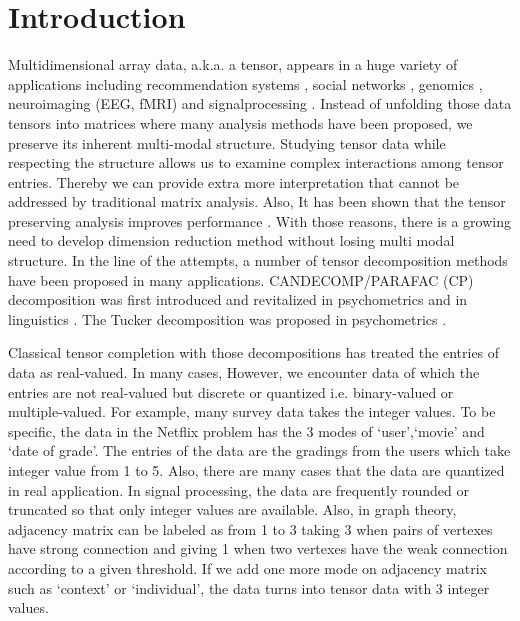 \documentclass{article}
\theoremstyle{plain}
\theoremstyle{definition}
\begin{document}
\section{Introduction}
Multidimensional array data, a.k.a. a tensor, appears in a huge variety of applications including recommendation systems \citep{Kutty2012APR,Adomavicius2008ContextawareRS,Sun2015ProvableST},
social networks \citep{Sun2009MultiVisCS,Nickel2011ATM},
genomics \citep{Wang2017ThreewayCO},
neuroimaging (EEG, fMRI) \citep{Miwakeichi_decomposingeeg}
and signalprocessing \citep{Sidiropoulos2000ParallelFA,Cichocki2015TensorDF}.
Instead of unfolding those data tensors into matrices where many analysis methods have been proposed, we preserve its inherent multi-modal structure. Studying tensor data while respecting the structure allows us to examine complex interactions among tensor entries. Thereby we can provide extra more interpretation that cannot be addressed by traditional matrix analysis. Also, It has been shown that the tensor preserving analysis improves performance \citep{Zare2018ExtensionOP,Wang2018LearningFB}.
With those reasons, there is a growing need to develop dimension reduction method without losing multi modal structure. In the line of the attempts, a number of tensor decomposition methods have been proposed in many applications. CANDECOMP/PARAFAC (CP) decomposition was first introduced \citep{doi:10.1002/sapm19287139}
and revitalized in psychometrics \citep{Harshman1970FoundationsOT} and in linguistics \citep{Smilde2004MultiwayAW}. The Tucker decomposition was proposed in psychometrics \citep{tucker64extension,RePEc:spr:psycho:v:31:y:1966:i:3:p:279-311}.

Classical tensor completion with those decompositions has treated the entries of data as real-valued.
In many cases, However, we encounter data of which the entries are not real-valued but discrete or quantized i.e. binary-valued or multiple-valued. For example, many survey data takes the integer values. To be specific, the data in the Netflix problem has the 3 modes of `user',`movie' and `date of grade'. The entries of the data are the gradings from the users which take integer value from 1 to 5. Also, there are many cases that the data are quantized in real application. In signal processing, the data are frequently rounded or truncated so that only integer values are available. Also, in graph theory, adjacency matrix can be labeled as from 1 to 3 taking 3 when pairs of vertexes have strong connection and giving 1 when two vertexes have the weak connection according to a given threshold. If we add one more mode on adjacency matrix such as `context' or `individual', the data turns into tensor data with 3 integer values.
\end{document}
